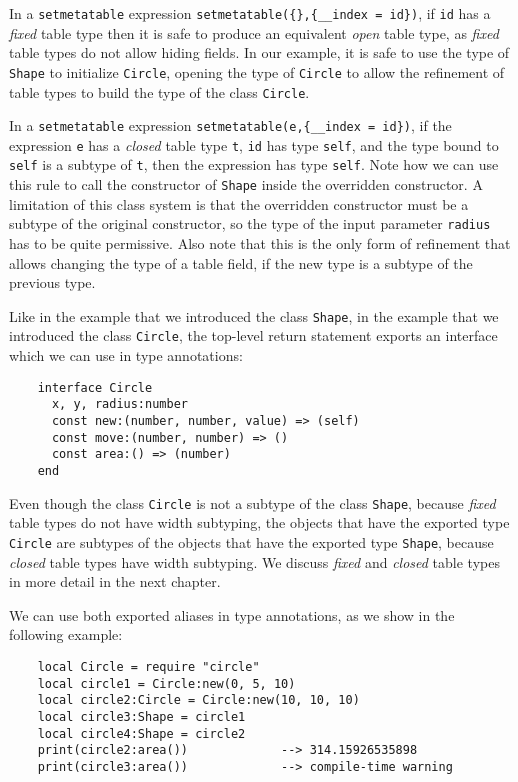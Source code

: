 In a \texttt{setmetatable} expression
\texttt{setmetatable(\{\},\{\string_\string_index = id\})},
if \texttt{id} has a \emph{fixed} table type then it is safe to
produce an equivalent \emph{open} table type, as \emph{fixed}
table types do not allow hiding fields.
In our example, it is safe to use the type of \texttt{Shape}
to initialize \texttt{Circle}, opening the type of \texttt{Circle}
to allow the refinement of table types to build the type of
the class \texttt{Circle}.

In a \texttt{setmetatable} expression
\texttt{setmetatable(e,\{\string_\string_index = id\})},
if the expression \texttt{e} has a \emph{closed} table type \texttt{t},
\texttt{id} has type \texttt{self}, and the type bound to \texttt{self}
is a subtype of \texttt{t}, then the expression has type \texttt{self}.
Note how we can use this rule to call the constructor of \texttt{Shape}
inside the overridden constructor.
A limitation of this class system is that the overridden constructor
must be a subtype of the original constructor,
so the type of the input parameter \texttt{radius} has to be quite permissive.
Also note that this is the only form of refinement that allows
changing the type of a table field, if the new type is a subtype
of the previous type.

Like in the example that we introduced the class \texttt{Shape},
in the example that we introduced the class \texttt{Circle},
the top-level return statement exports an
interface which we can use in type annotations:
\begin{verbatim}
    interface Circle
      x, y, radius:number
      const new:(number, number, value) => (self)
      const move:(number, number) => ()
      const area:() => (number)
    end
\end{verbatim}

Even though the class \texttt{Circle} is not a subtype of the
class \texttt{Shape}, because \emph{fixed} table types do not
have width subtyping, the objects that have the exported type
\texttt{Circle} are subtypes of the objects that have the
exported type \texttt{Shape}, because \emph{closed} table types
have width subtyping.
We discuss \emph{fixed} and \emph{closed} table types in more
detail in the next chapter.

We can use both exported aliases in type annotations, as we
show in the following example:
\begin{verbatim}
    local Circle = require "circle"
    local circle1 = Circle:new(0, 5, 10)
    local circle2:Circle = Circle:new(10, 10, 10)
    local circle3:Shape = circle1
    local circle4:Shape = circle2
    print(circle2:area())             --> 314.15926535898
    print(circle3:area())             --> compile-time warning
\end{verbatim}

